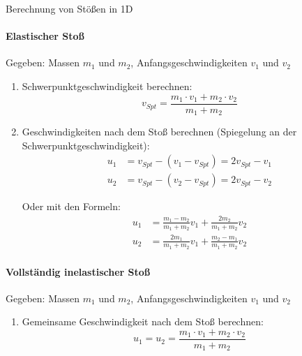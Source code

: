 \begin{KR}{Berechnung von Stößen in 1D}\\
    \paragraph{Elastischer Stoß}
    Gegeben: Massen $m_1$ und $m_2$, Anfangsgeschwindigkeiten $v_1$ und $v_2$
    \begin{enumerate}
        \item Schwerpunktgeschwindigkeit berechnen:
        \begin{equation}
            v_{Spt} = \frac{m_1 \cdot v_1 + m_2 \cdot v_2}{m_1 + m_2}
        \end{equation}
        
        \item Geschwindigkeiten nach dem Stoß berechnen (Spiegelung an der Schwerpunktgeschwindigkeit):
        \begin{align}
            u_1 &= v_{Spt} - (v_1 - v_{Spt}) = 2v_{Spt} - v_1 \\
            u_2 &= v_{Spt} - (v_2 - v_{Spt}) = 2v_{Spt} - v_2
        \end{align}
        
        Oder mit den Formeln:
        \begin{align}
            u_1 &= \frac{m_1 - m_2}{m_1 + m_2}v_1 + \frac{2m_2}{m_1 + m_2}v_2 \\
            u_2 &= \frac{2m_1}{m_1 + m_2}v_1 + \frac{m_2 - m_1}{m_1 + m_2}v_2
        \end{align}
    \end{enumerate}
    
    \paragraph{Vollständig inelastischer Stoß}
    Gegeben: Massen $m_1$ und $m_2$, Anfangsgeschwindigkeiten $v_1$ und $v_2$
    \begin{enumerate}
        \item Gemeinsame Geschwindigkeit nach dem Stoß berechnen:
        \begin{equation}
            u_1 = u_2 = \frac{m_1 \cdot v_1 + m_2 \cdot v_2}{m_1 + m_2}
        \end{equation}
    \end{enumerate}
\end{KR}

